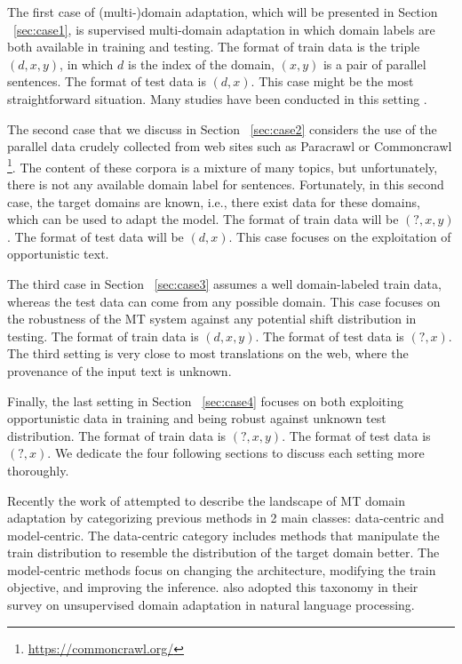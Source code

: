 The first case of (multi-)domain adaptation, which will be presented in Section ~\ref{sec:case1}, is supervised multi-domain adaptation in which domain labels are both available in training and testing. The format of train data is the triple $(d,x,y)$, in which $d$ is the index of the domain, $(x,y)$ is a pair of parallel sentences. The format of test data is $(d,x)$. This case might be the most straightforward situation. Many studies have been conducted in this setting \citep{Pham21revisiting}.

The second case that we discuss in Section ~\ref{sec:case2} considers the use of the parallel data crudely collected from web sites such as Paracrawl \citep{Banon20Paracrawl} or Commoncrawl \footnote{\url{https://commoncrawl.org/}}. The content of these corpora is a mixture of many topics, but unfortunately, there is not any available domain label for sentences. Fortunately, in this second case, the target domains are known, i.e., there exist data for these domains, which can be used to adapt the model. The format of train data will be $(?,x,y)$. The format of test data will be $(d,x)$. This case focuses on the exploitation of opportunistic text. 

The third case in Section ~\ref{sec:case3} assumes a well domain-labeled train data, whereas the test data can come from any possible domain. This case focuses on the robustness of the MT system against any potential shift distribution in testing. The format of train data is $(d,x,y)$. The format of test data is $(?,x)$. The third setting is very close to most translations on the web, where the provenance of the input text is unknown. 

Finally, the last setting in Section ~\ref{sec:case4} focuses on both exploiting opportunistic data in training and being robust against unknown test distribution. The format of train data is $(?,x,y)$. The format of test data is $(?,x)$. We dedicate the four following sections to discuss each setting more thoroughly.

Recently the work of \citet{Chu18survey} attempted to describe the landscape of MT domain adaptation by categorizing previous methods in 2 main classes: data-centric and model-centric. The data-centric category includes methods that manipulate the train distribution to resemble the distribution of the target domain better. The model-centric methods focus on changing the architecture, modifying the train objective, and improving the inference. \citet{ramponi20neural} also adopted this taxonomy in their survey on unsupervised domain adaptation in natural language processing.

